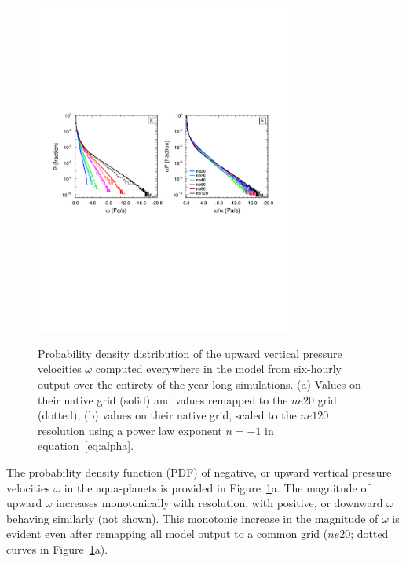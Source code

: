 \documentclass[times]{qjrms4}
\begin{document}
\begin{figure}
\begin{center}
\noindent\includegraphics[width=20pc,angle=0]{figs/temp_2pdf.pdf}\\
\end{center}
\caption{Probability density distribution of the upward vertical pressure velocities $\omega$ computed everywhere in the model from six-hourly output over the entirety of the year-long simulations. (a) Values on their native grid (solid) and values remapped to the $ne20$ grid (dotted), (b) values on their native grid, scaled to the $ne120$ resolution using a power law exponent $n=-1$ in equation~\ref{eq:alpha}.}
\label{fig:2pdf}
\end{figure}

The probability density function (PDF) of negative, or upward vertical pressure velocities $\omega$ in the aqua-planets is provided in Figure~\ref{fig:2pdf}a. The magnitude of upward $\omega$ increases monotonically with resolution, with positive, or downward $\omega$ behaving similarly (not shown). This monotonic increase in the magnitude of $\omega$ is evident even after remapping all model output to a common grid ($ne20$; dotted curves in Figure~\ref{fig:2pdf}a).
\end{document}
